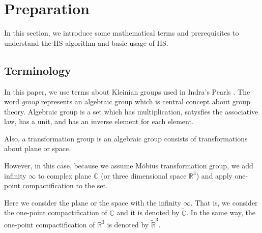 
\section{Preparation}

In this section, we introduce some mathematical terms and prerequisites
to understand the IIS algorithm and basic usage of IIS.

\subsection{Terminology}

In this paper, we use terms about Kleinian groups used in Indra's
Pearls \cite{MumfordSeriesWright200204}.
The word \textit{group} represents an algebraic group which is
central concept about group theory.
Algebraic group is a set which has multiplication, satysfies the
associative law, has a unit, and has an inverse element for each
element.

Also, a transformation group is an algebraic group consists of transformations 
about plane or space.


However, in this case, because we assume M\"obius transformation
group, we add infinity $\infty$ to complex plane $\mathbb{C}$ (or three
dimensional space $\mathbb{R}^3$) and apply one-point compactification
to the set. \par
Here we consider the plane or the space with the infinity $\infty$. 
That is, we consider the one-point compactification of $\mathbb{C}$ and
it is denoted by $\tilde{\mathbb{C}}$. 
In the same way, the one-point compactification of $\mathbb{R}^3$ is 
denoted by $\tilde{ \mathbb{R} }^3$.

